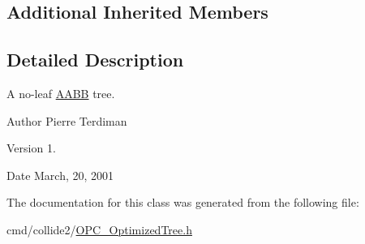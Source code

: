 \subsection*{Additional Inherited Members}


\subsection{Detailed Description}
A no-\/leaf \hyperlink{classAABB}{A\+A\+BB} tree.

\begin{DoxyAuthor}{Author}
Pierre Terdiman 
\end{DoxyAuthor}
\begin{DoxyVersion}{Version}
1. 
\end{DoxyVersion}
\begin{DoxyDate}{Date}
March, 20, 2001 
\end{DoxyDate}


The documentation for this class was generated from the following file\+:\begin{DoxyCompactItemize}
\item 
cmd/collide2/\hyperlink{OPC__OptimizedTree_8h}{O\+P\+C\+\_\+\+Optimized\+Tree.\+h}\end{DoxyCompactItemize}
